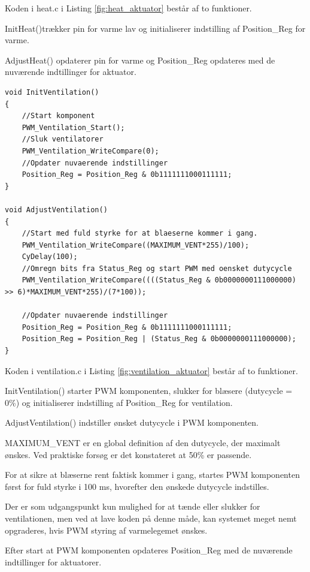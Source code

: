 Koden i heat.c i Listing \ref{fig:heat_aktuator} består af to funktioner. 

InitHeat()trækker pin for varme lav og initialiserer indstilling af Position\_Reg for varme.

AdjustHeat() opdaterer pin for varme og Position\_Reg opdateres med de nuværende indtillinger for aktuator. 

\clearpage

\begin{lstlisting}[caption=Udsnit af ventilation.c for PSoC4 i Aktuator, label=fig:ventilation_aktuator]
void InitVentilation()
{
    //Start komponent
    PWM_Ventilation_Start();
    //Sluk ventilatorer
    PWM_Ventilation_WriteCompare(0);
    //Opdater nuvaerende indstillinger
    Position_Reg = Position_Reg & 0b1111111000111111;
}

void AdjustVentilation()
{
    //Start med fuld styrke for at blaeserne kommer i gang.
    PWM_Ventilation_WriteCompare((MAXIMUM_VENT*255)/100);
    CyDelay(100);
    //Omregn bits fra Status_Reg og start PWM med oensket dutycycle
    PWM_Ventilation_WriteCompare((((Status_Reg & 0b0000000111000000) >> 6)*MAXIMUM_VENT*255)/(7*100));
    
    //Opdater nuvaerende indstillinger
    Position_Reg = Position_Reg & 0b1111111000111111;
    Position_Reg = Position_Reg | (Status_Reg & 0b0000000111000000);
}
\end{lstlisting}

Koden i ventilation.c i Listing \ref{fig:ventilation_aktuator} består af to funktioner. 

InitVentilation() starter PWM komponenten, slukker for blæsere (dutycycle = 0\%) og initialiserer indstilling af Position\_Reg for ventilation.

AdjustVentilation() indstiller ønsket dutycycle i PWM komponenten. 

MAXIMUM\_VENT er en global definition af den dutycycle, der maximalt ønskes. Ved praktiske forsøg er det konstateret at 50\% er passende.

For at sikre at blæserne rent faktisk kommer i gang, startes PWM komponenten først for fuld styrke i 100 ms, hvorefter den ønskede dutycycle indstilles.

Der er som udgangspunkt kun mulighed for at tænde eller slukker for ventilationen, men ved at lave koden på denne måde, kan systemet meget nemt opgraderes, hvis PWM styring af varmelegemet ønskes. 

Efter start at PWM komponenten opdateres Position\_Reg med de nuværende indtillinger for aktuatorer.

